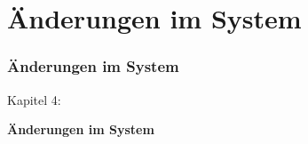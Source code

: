 %

\section{Änderungen im System}
\begin{frame}[fragile]
	\frametitle{Änderungen im System}

	\begin{center}\huge{Kapitel 4:}\end{center}
	\begin{center}\huge{\color{typo3darkgrey}\textbf{Änderungen im System}}\end{center}

\end{frame}


